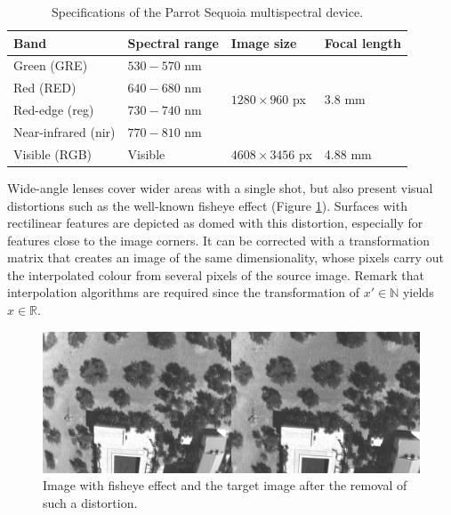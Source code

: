 \renewcommand{\arraystretch}{1.2}
\begin{table}[ht]
    \small
    \caption{Specifications of the Parrot Sequoia multispectral device.}
    \label{table:parrot_sequoia}
    \begin{tabular}{llll}
        \toprule
        Band & Spectral range & Image size & Focal length\\
        \midrule
        Green (GRE) & $530-570$ \si{\nano\meter} & \multirow{4}{*}{$1280 \times 960$ px} & \multirow{4}{*}{3.8 \si{\milli\meter}}\\
        Red (RED) & $640-680$ \si{\nano\meter} & & \\
        Red-edge (\acrshort{reg}) & $730-740$ \si{\nano\meter} & & \\
        Near-infrared (\acrshort{nir}) & $770-810$ \si{\nano\meter} & &\\
        \cmidrule{1-4}
        Visible (RGB) & Visible & $4608 \times 3456$ px & 4.88 \si{\milli\meter}\\
        \bottomrule
    \end{tabular}
\end{table}
\renewcommand{\arraystretch}{1}

Wide-angle lenses cover wider areas with a single shot, but also present visual distortions such as the well-known fisheye effect (Figure \ref{fig:fisheye_sample}). Surfaces with rectilinear features are depicted as domed with this distortion, especially for features close to the image corners. It can be corrected with a transformation matrix that creates an image of the same dimensionality, whose pixels carry out the interpolated colour from several pixels of the source image. Remark that interpolation algorithms are required since the transformation of $x' \in \mathbb{N}$ yields $x \in \mathbb{R}$.

\begin{figure}[ht]
	\includegraphics{figs/materials/fisheye_sample.png}
	\caption{Image with fisheye effect and the target image after the removal of such a distortion.}
	\label{fig:fisheye_sample}
\end{figure}

